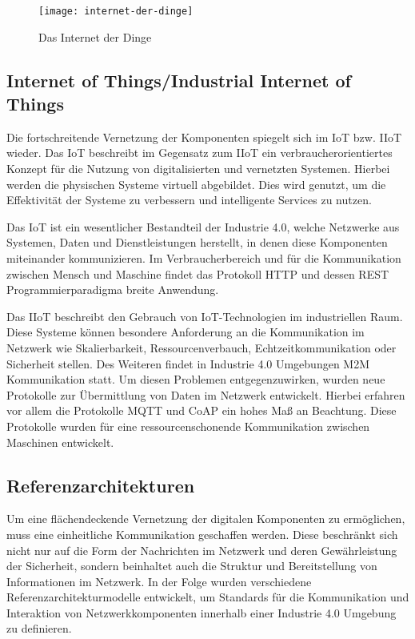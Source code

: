 \begin{figure}[h]
  \centering
  \texttt{[image: internet-der-dinge]}
  \caption{Das Internet der Dinge}
  \label{Grundlagen:Das Internet der Dinge}
\end{figure}

\clearpage

\subsection{Internet of Things/Industrial Internet of Things}
\label{Grundlagen:IoT/IIoT}
Die fortschreitende Vernetzung der Komponenten spiegelt sich im \ac{IoT} bzw. \ac{IIoT} wieder. Das \ac{IoT} beschreibt im Gegensatz zum \ac{IIoT} ein verbraucherorientiertes Konzept für die Nutzung von digitalisierten und vernetzten Systemen. Hierbei werden die physischen Systeme virtuell abgebildet. Dies wird genutzt, um die Effektivität der Systeme zu verbessern und intelligente Services zu nutzen.

Das \ac{IoT} ist ein wesentlicher Bestandteil der Industrie 4.0, welche Netzwerke aus Systemen, Daten und Dienstleistungen herstellt, in denen diese Komponenten miteinander kommunizieren. Im Verbraucherbereich und für die Kommunikation zwischen Mensch und Maschine findet das Protokoll \ac{HTTP} und dessen \ac{REST} Programmierparadigma breite Anwendung. 

Das \ac{IIoT} beschreibt den Gebrauch von \ac{IoT}-Technologien im industriellen Raum. Diese Systeme können besondere Anforderung an die Kommunikation im Netzwerk wie Skalierbarkeit, Ressourcenverbauch, Echtzeitkommunikation oder Sicherheit stellen. Des Weiteren findet in Industrie 4.0 Umgebungen \ac{M2M} Kommunikation statt. Um diesen Problemen entgegenzuwirken, wurden neue Protokolle zur Übermittlung von Daten im Netzwerk entwickelt. Hierbei erfahren vor allem die Protokolle \ac{MQTT} und \ac{CoAP} ein hohes Maß an Beachtung. Diese Protokolle wurden für eine ressourcenschonende Kommunikation zwischen Maschinen entwickelt.

\subsection{Referenzarchitekturen}
Um eine flächendeckende Vernetzung der digitalen Komponenten zu ermöglichen, muss eine einheitliche Kommunikation geschaffen werden. Diese beschränkt sich nicht nur auf die Form der Nachrichten im Netzwerk und deren Gewährleistung der Sicherheit, sondern beinhaltet auch die Struktur und Bereitstellung von Informationen im Netzwerk. In der Folge wurden verschiedene Referenzarchitekturmodelle entwickelt, um Standards für die Kommunikation und Interaktion von Netzwerkkomponenten innerhalb einer Industrie 4.0 Umgebung zu definieren.

